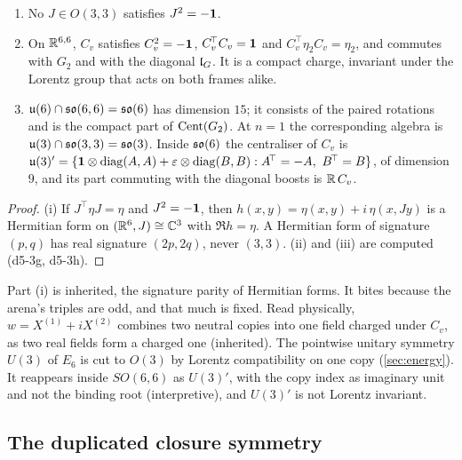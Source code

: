 \begin{proposition}
\label{d5:prop:cx}
\begin{enumerate}[label=(\roman*),leftmargin=2.2em]
\item No $J\in O(3,3)$ satisfies $J^2=-\mathbf 1$.
\item On $\mathbb{R}^{6,6}$, $C_v$ satisfies $C_v^2=-\mathbf 1$, $C_v^{\!\top}C_v=\mathbf 1$ and $C_v^{\!\top}\eta_2C_v=\eta_2$, and commutes with $G_2$ and with the diagonal
$\mathfrak l_G$. It is a compact charge, invariant under the Lorentz group that acts on both frames alike.
\item $\mathfrak{u}(6)\cap\mathfrak{so}(6,6)=\mathfrak{so}(6)$ has dimension $15$; it consists of the paired rotations and is the compact part of $\operatorname{Cent}(G_2)$. At $n=1$ the
corresponding algebra is $\mathfrak{u}(3)\cap\mathfrak{so}(3,3)=\mathfrak{so}(3)$. Inside $\mathfrak{so}(6)$ the centraliser of $C_v$ is
$\uu3'=\{\id\otimes\operatorname{diag}(A,A)+\varepsilon\otimes\operatorname{diag}(B,B):A^{\!\top}=-A,\ B^{\!\top}=B\}$, of dimension $9$, and its part
commuting with the diagonal boosts is $\mathbb{R}\,C_v$.
\end{enumerate}
\end{proposition}

\begin{proof}
(i) If $J^{\!\top}\eta J=\eta$ and $J^2=-\mathbf 1$, then $h(x,y)=\eta(x,y)+i\,\eta(x,Jy)$ is a Hermitian form on $(\mathbb{R}^6,J)\cong\mathbb{C}^3$ with $\Re h=\eta$. A
Hermitian form of signature $(p,q)$ has real signature $(2p,2q)$, never $(3,3)$. (ii) and (iii) are computed (d5-3g, d5-3h).
\end{proof}

Part (i) is inherited, the signature parity of Hermitian forms. It bites because the arena's triples are odd, and that much is fixed. Read
physically, $w=X^{(1)}+iX^{(2)}$ combines two neutral copies into one field charged under $C_v$, as two real fields form a charged one
(inherited). The pointwise unitary symmetry $U(3)$ of $E_6$ is cut to $O(3)$ by Lorentz compatibility on one copy
(\cref{sec:energy}). It reappears inside $SO(6,6)$ as $U(3)'$, with the copy index as imaginary unit and not the binding root
(interpretive), and $U(3)'$ is not Lorentz invariant.

\subsection{The duplicated closure symmetry}
\label{d5:sec:closure}

